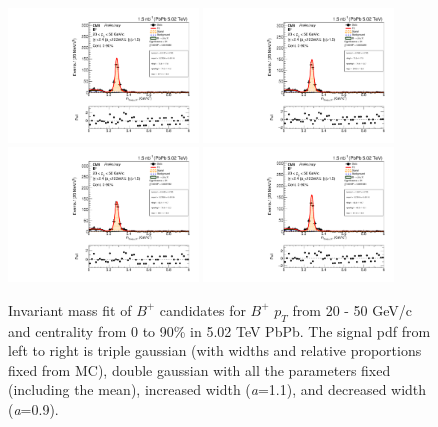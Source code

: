 \begin{figure}[hbtp]
\begin{center}
\includegraphics[width=0.45\textwidth]{Figures/Chapter5/data_PbPb_1_Bpt_2050_3gauss_doubly0_ntKp.pdf}
\includegraphics[width=0.45\textwidth]{Figures/Chapter5/data_PbPb_1_Bpt_2050_fixed_doubly0_ntKp.pdf}
\includegraphics[width=0.45\textwidth]{Figures/Chapter5/data_PbPb_1_Bpt_2050_scal+_doubly0_ntKp.pdf}
\includegraphics[width=0.45\textwidth]{Figures/Chapter5/data_PbPb_1_Bpt_2050_scal-_doubly0_ntKp.pdf}
\caption{Invariant mass fit of $B^+$ candidates for $B^+$ $p_T$ from 20 - 50 GeV/c and centrality from 0 to 90\% in 5.02 TeV PbPb. The signal pdf from left to right is triple gaussian (with widths and relative proportions fixed from MC), double gaussian with all the parameters fixed (including the mean), increased width (\textit{a}=1.1), and decreased width (\textit{a}=0.9).}
\label{BPSigVar}
\end{center}
\end{figure}

